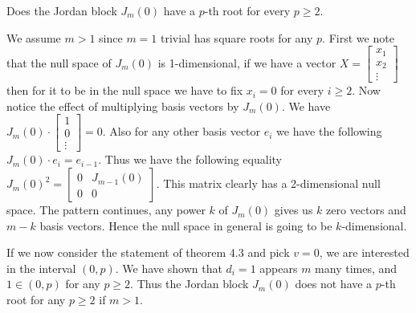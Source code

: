 \documentclass{article}
\begin{document}
\begin{problem}
  Does the Jordan block $J_m(0)$ have a $p$-th root for every $p \ge 2$.
\end{problem}

\begin{solution}
  We assume $m > 1$ since $m = 1$ trivial has square roots for any $p$.
  First we note that the null space of $J_m (0)$ is 1-dimensional, if we have a vector $X = \begin{bmatrix} x_1\\ x_2\\ \vdots \end{bmatrix}$ then for it to be in the null space we have to fix $x_i = 0$ for every $i \ge 2$.
  Now notice the effect of multiplying basis vectors by $J_m (0)$.
  We have $J_m (0) \cdot \begin{bmatrix} 1\\ 0\\ \vdots \end{bmatrix} = 0$.
  Also for any other basis vector $e_i$ we have the following $J_m (0) \cdot e_i = e_{i - 1}$.
  Thus we have the following equality $J_m (0)^2 = \begin{bmatrix} 0 & J_{m - 1} (0)\\ 0 & 0 \end{bmatrix}$.
  This matrix clearly has a 2-dimensional null space.
  The pattern continues, any power $k$ of $J_m (0)$ gives us $k$ zero vectors and $m - k$ basis vectors.
  Hence the null space in general is going to be $k$-dimensional.
  
  If we now consider the statement of theorem 4.3 and pick $v = 0$, we are interested in the interval $(0, p)$.
  We have shown that $d_i = 1$ appears $m$ many times, and $1 \in (0, p)$ for any $p \ge 2$.
  Thus the Jordan block $J_m (0)$ does not have a $p$-th root for any $p \ge 2$ if $m > 1$.
\end{solution}
\end{document}
